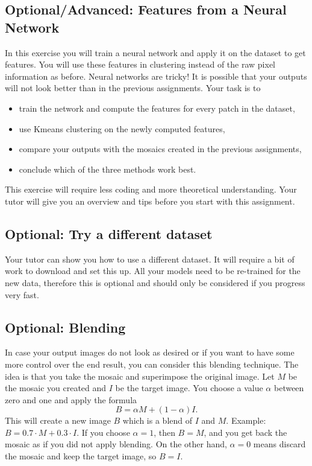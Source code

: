 \documentclass[a4paper]{article}
\begin{document}
	\subsection{Optional/Advanced: Features from a Neural Network}
		In this exercise you will train a neural network and apply it on the dataset to get features. 
		You will use these features in clustering instead of the raw pixel information as before.
		Neural networks are tricky! It is possible that your outputs will not look better than in the previous assignments.
		Your task is to
		\begin{itemize}
			\item train the network and compute the features for every patch in the dataset,
			\item use Kmeans clustering on the newly computed features,
			\item compare your outputs with the mosaics created in the previous assignments,
			\item conclude which of the three methods work best.
		\end{itemize}
		This exercise will require less coding and more theoretical understanding.
		Your tutor will give you an overview and tips before you start with this assignment.
	
	\subsection{Optional: Try a different dataset}
		Your tutor can show you how to use a different dataset. 
		It will require a bit of work to download and set this up.
		All your models need to be re-trained for the new data, therefore this is optional and should only be considered if you progress very fast.
		
		
	\subsection{Optional: Blending}
		In case your output images do not look as desired or if you want to have some more control over the end result, you can consider this blending technique.
		The idea is that you take the mosaic and superimpose the original image.
		Let $M$ be the mosaic you created and $I$ be the target image.
		You choose a value $\alpha$ between zero and one and apply the formula
		\begin{equation}
			B = \alpha M + (1 - \alpha) I.
		\end{equation}
		This will create a new image $B$ which is a blend of $I$ and $M$.
		Example: $B = 0.7 \cdot M + 0.3 \cdot I$.
		If you choose $\alpha = 1$, then $B = M$, and you get back the mosaic as if you did not apply blending.
		On the other hand, $\alpha = 0$ means discard the mosaic and keep the target image, so $B = I$.
		
\end{document}
